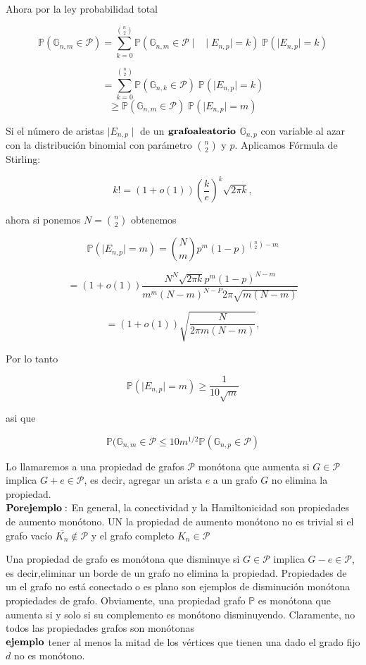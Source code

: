 \documentclass[11pt,a4paper]{article}
\newcommand{\dis}{\displaystyle}
\begin{document}
Ahora por la ley probabilidad total

$$\mathbb{P}(\mathbb{G}_{n,m}\in \mathcal{P})=\sum_{k=0}^{\binom {n}{2}} \mathbb{P}(\mathbb{G}_{n,m}\in \mathcal{P} \mid\;\;\mid E_{n,p} \mid = k)\;\mathbb{P}(\mid E_{n,p}\mid =k)$$

$$ = \sum_{k=0}^{\binom {n}{2}} \mathbb{P}(\mathbb{G}_{n,k}\in \mathcal{P})\;\mathbb{P}(\mid E_{n,p}\mid =k)$$
$$ \geqslant\mathbb{P}(\mathbb{G}_{n,m}\in \mathcal{P})\;\mathbb{P}(\mid E_{n,p}\mid =m) $$

Si el n\'umero de aristas $\mid E_{n,p}\mid$ de un ${\bf grafo aleatorio}$ $\mathbb{G}_{n,p}$ con variable al azar con la distribuci\'on binomial con par\'ametro $\binom{n}{2}$ y $p$. Aplicamos  F\'ormula de Stirling:

$$k!=(1+ o(1))\left(\frac{k}{e}\right)^k \sqrt{2\pi k}, $$

ahora si ponemos $N=\binom {n}{2}$ obtenemos


$$\mathbb{P}(\mid E_{n,p}\mid = m)= \dis\binom{N}{m} p^m(1-p)^{\binom {n}{2}-m} $$

$$ =(1+ o(1))\frac{N^N\sqrt{2\pi k}p^m(1-p)^{N-m}}{m^m(N-m)^{N-P}2\pi \sqrt{m(N-m)}}$$

$$=(1+ o(1))\sqrt{\frac{N}{2\pi m(N-m)}},$$

Por lo tanto
 
$$\mathbb{P}(\mid E_{n,p}\mid = m)\geq \frac{1}{10\sqrt{m}}$$

asi que
  
  $$\mathbb{P}(\mathbb{G}_{n,m}\in \mathcal{P} \leqslant 10m^{1/2}\mathbb{P}(\mathbb{G}_{n,p}\in \mathcal{P})$$

Lo llamaremos a una propiedad de grafos $\mathcal{P}$ 
mon\'otona\; que\; aumenta si $G \in  \mathcal{P}$ 
implica $G + e \in \mathcal{P}$, es decir, agregar un arista $e$ a un grafo $G$ no elimina la propiedad.\\

${\bf Por ejemplo:}$ En general, la conectividad y la Hamiltonicidad son propiedades de aumento mon\'otono. UN
la propiedad de aumento mon\'otono no es trivial si el grafo vac\'io $\overline{K_n}\notin \mathcal{P}$ y el grafo completo $K_n \in \mathcal{P}$


Una propiedad de grafo es monótona que disminuye si $G\in \mathcal{P}$  implica $G - e \in \mathcal{P} $, es decir,eliminar un borde  de un grafo no elimina la propiedad. Propiedades de un
el grafo no está conectado o es plano son ejemplos de disminuci\'on mon\'otona  propiedades de grafo. Obviamente, una propiedad grafo $\mathbb{P}$ es mon\'otona que aumenta si y solo si su complemento es mon\'otono disminuyendo. Claramente, no todos las propiedades grafos son mon\'otonas\\
${\bf ejemplo}$ tener al menos la mitad de los v\'ertices que tienen una dado el grado fijo $d$ no es mon\'otono.\\
\end{document}
